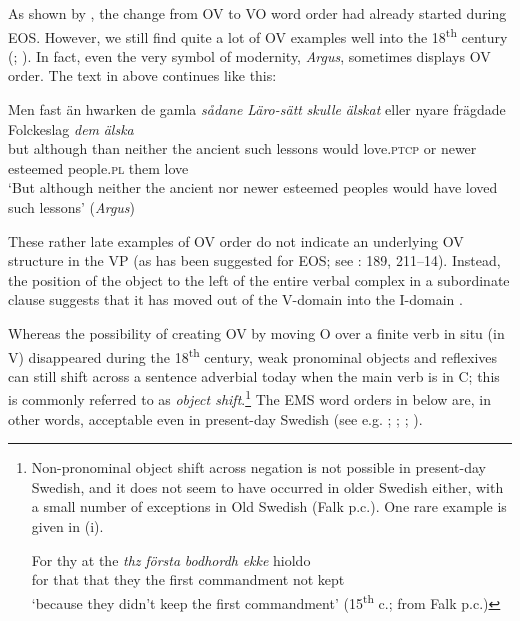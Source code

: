 \documentclass[output=paper]{langscibook}
\begin{document}
As shown by \citet{Delsing1999}, the change from OV to VO word order had already started during EOS. However, we still find quite a lot of OV examples well into the 18\textsuperscript{th} century (\citealt{Petzell2011}; \citealt{Sangfelt2019}). In fact, even the very symbol of modernity, \textit{Argus}, sometimes displays OV order. The text in  above continues like this:


\ea
\gll Men  fast      än   hwarken de gamla \textit{sådane} \textit{Läro-sätt} \textit{skulle} \textit{älskat} eller   nyare     frägdade   Folckeslag \textit{dem} \textit{älska}\\
but     although   than   neither   the ancient  such       lessons    would  love\textsc{.ptcp} or  newer  esteemed people.\textsc{pl}  them love\\
\glt ‘But although neither the ancient nor newer esteemed peoples would have loved such lessons’ (\textit{Argus})
\z

These rather late examples of OV order do not indicate an underlying OV structure in the VP (as has been suggested for EOS; see \citealt{Delsing1999}: 189, 211–14). Instead, the position of the object to the left of the entire verbal complex in a subordinate clause suggests that it has moved out of the V-domain into the I-domain \citep{Petzell2011}. 



Whereas the possibility of creating OV by moving O over a finite verb in situ (in V) disappeared during the 18\textsuperscript{th} century, weak pronominal objects and reflexives can still shift across a sentence adverbial today when the main verb is in C; this is commonly referred to as \textit{object shift}.\footnote{Non-pronominal
    object shift across negation is not possible in present-day Swedish, and it does not seem to have occurred in older Swedish either, with a small number of exceptions in Old Swedish (Falk p.c.). One rare example is given in (i).

    \ea
    \gll  For thy at   the \textit{thz} \textit{första} \textit{bodhordh} \textit{ekke} hioldo\\
        for that that   they   the first   commandment   not   kept\\
        \glt ‘because they didn’t keep the first commandment’ (15\textsuperscript{th} c.; from Falk p.c.)
    \z
    }
The EMS word orders in  below are, in other words, acceptable even in present-day Swedish (see e.g. \citealt{Holmberg1986}; \citealt{Andreasson2008}; \citealt{Bentzen2014}; \citealt{Erteschik-ShirJosefsson2017}).
\end{document}
